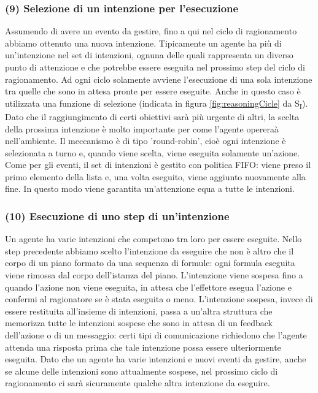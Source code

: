 \documentclass[12pt,a4paper,openright,twoside]{report}
\begin{document}
\subsubsection{(9) Selezione di un intenzione per l'esecuzione}
Assumendo di avere un evento da gestire, fino a qui nel ciclo di ragionamento abbiamo ottenuto una nuova intenzione. Tipicamente un agente ha pi\`u di un'intenzione nel set di intenzioni, ognuna delle quali rappresenta un diverso punto di attenzione e che potrebbe essere eseguita nel prossimo step del ciclo di ragionamento. Ad ogni ciclo solamente avviene l'esecuzione di una sola intenzione tra quelle che sono in attesa pronte per essere eseguite. Anche in questo caso \`e utilizzata una funzione di selezione (indicata in figura \ref{fig:reasoningCicle} da S\textsubscript{I}). Dato che il raggiungimento di certi obiettivi sar\`a pi\`u urgente di altri, la scelta della prossima intenzione \`e molto importante per come l'agente operera\`a nell'ambiente.
Il meccanismo \`e di tipo 'round-robin', cio\`e ogni intenzione \`e selezionata a turno e, quando viene scelta, viene eseguita solamente un'azione. Come per gli eventi, il set di intenzioni \`e gestito con politica FIFO: viene preso il primo elemento della lista e, una volta eseguito, viene aggiunto nuovamente alla fine. In questo modo viene garantita un'attenzione equa a tutte le intenzioni.


\subsubsection{(10) Esecuzione di uno step di un'intenzione}
Un agente ha varie intenzioni che competono tra loro per essere eseguite. Nello step precedente abbiamo scelto l'intenzione da eseguire che non \`e altro che il corpo di un piano formato da una sequenza di formule: ogni formula eseguita viene rimossa dal corpo dell'istanza del piano.
L'intenzione viene sospesa fino a quando l'azione non viene eseguita, in attesa che l'effettore esegua l'azione e confermi al ragionatore se \`e stata eseguita o meno. L'intenzione sospesa, invece di essere restituita all'insieme di intenzioni, passa a un'altra struttura che memorizza tutte le intenzioni sospese che sono in attesa di un feedback dell'azione o di un messaggio: certi tipi di comunicazione richiedono che l'agente attenda una risposta prima che tale intenzione possa essere ulteriormente eseguita. Dato che un agente ha varie intenzioni e nuovi eventi da gestire, anche se alcune delle intenzioni sono attualmente sospese, nel prossimo ciclo di ragionamento ci sar\`a sicuramente qualche altra intenzione da eseguire.
\end{document}
